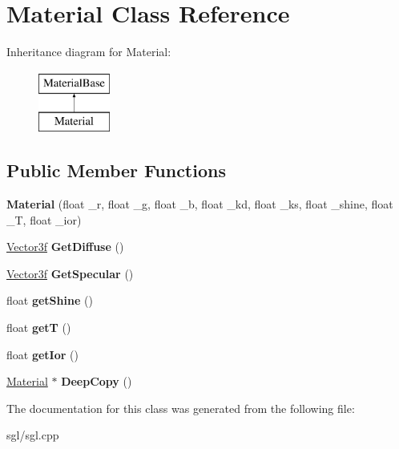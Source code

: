 \hypertarget{class_material}{}\section{Material Class Reference}
\label{class_material}
Inheritance diagram for Material\+:\begin{figure}[H]
\begin{center}
\leavevmode
\includegraphics[height=2.000000cm]{class_material}
\end{center}
\end{figure}
\subsection*{Public Member Functions}
\begin{DoxyCompactItemize}
\item 
\mbox{\label{class_material_a957af887ea4d0aaaa89f3319566e7af5}} 
{\bfseries Material} (float \+\_\+r, float \+\_\+g, float \+\_\+b, float \+\_\+kd, float \+\_\+ks, float \+\_\+shine, float \+\_\+T, float \+\_\+ior)
\item 
\mbox{\label{class_material_ada6fe0016d0d41d8b63e7cad2889a092}} 
\hyperlink{class_vector3f}{Vector3f} {\bfseries Get\+Diffuse} ()
\item 
\mbox{\label{class_material_a23fa17b658a06e37945da193c90dcdec}} 
\hyperlink{class_vector3f}{Vector3f} {\bfseries Get\+Specular} ()
\item 
\mbox{\label{class_material_a7362556d533530d59908cbd7ec0a799e}} 
float {\bfseries get\+Shine} ()
\item 
\mbox{\label{class_material_a35f77eb9c342cc18cb649a9bccb8a86a}} 
float {\bfseries getT} ()
\item 
\mbox{\label{class_material_a665dc0bbab498a7930b35fa1a6467830}} 
float {\bfseries get\+Ior} ()
\item 
\mbox{\label{class_material_ae456e321277b0b3ca7167e217f3cc3cd}} 
\hyperlink{class_material}{Material} $\ast$ {\bfseries Deep\+Copy} ()
\end{DoxyCompactItemize}


The documentation for this class was generated from the following file\+:\begin{DoxyCompactItemize}
\item 
sgl/sgl.\+cpp\end{DoxyCompactItemize}
